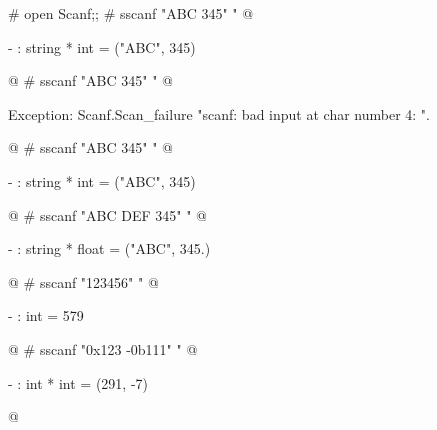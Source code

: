 \begin{ocaml}
# open Scanf;;
# sscanf "ABC   345" "%
@
\begin{topoutput}
- : string * int = ("ABC", 345)
\end{topoutput}
@
# sscanf "ABC 345" "%
@
\begin{toperror}
Exception: Scanf.Scan_failure "scanf: bad input at char number 4:  ".
\end{toperror}
@
# sscanf "ABC 345" "%
@
\begin{topoutput}
- : string * int = ("ABC", 345)
\end{topoutput}
@
# sscanf "ABC DEF 345" "%
@
\begin{topoutput}
- : string * float = ("ABC", 345.)
\end{topoutput}
@
# sscanf "123456" "%
@
\begin{topoutput}
- : int = 579
\end{topoutput}
@
# sscanf "0x123 -0b111" "%
@
\begin{topoutput}
- : int * int = (291, -7)
\end{topoutput}
@
\end{ocaml}

